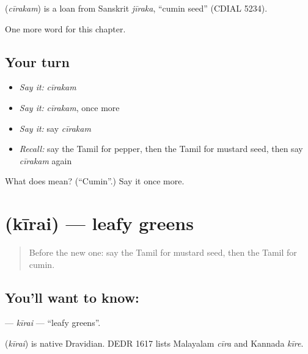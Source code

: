 \begin{cousinweb}
\textbf{} (\emph{cīrakam}) is a loan from Sanskrit \emph{jīraka}, \textquotedblleft{}cumin seed\textquotedblright{} (CDIAL 5234).
\end{cousinweb}

\begin{grammarlens}[title={What you've built}]
One more word for this chapter.
\end{grammarlens}

\subsection*{Your turn}
\begin{itemize}
\raggedright
  \item \emph{Say it:} \emph{cīrakam}
  \item \emph{Say it:} \emph{cīrakam}, once more
  \item \emph{Say it:} say \emph{cīrakam}
  \item \emph{Recall:} say the Tamil for pepper, then the Tamil for mustard seed, then say \emph{cīrakam} again
\end{itemize}

\begin{tcolorbox}[breakable,colback=teal!4,colframe=teal!35!black,title={Before you move on}]
What does  mean? (\textquotedblleft{}Cumin\textquotedblright{}.) Say it once more.
\end{tcolorbox}
\section[\texorpdfstring{\ta{கீரை} (kīrai)}{கீரை (kīrai)}]{ (kīrai) — leafy greens}

\label{lesson:TA-C139-kirai}



\begin{quote}
Before the new one: say the Tamil for mustard seed, then the Tamil for cumin.
\end{quote}

\subsection*{You'll want to know: }
\textbf{} — \emph{kīrai} — \textquotedblleft{}leafy greens\textquotedblright{}.

\begin{cousinweb}
\textbf{} (\emph{kīrai}) is native Dravidian. DEDR 1617 lists Malayalam \emph{cīra} and Kannada \emph{kīre}.
\end{cousinweb}

